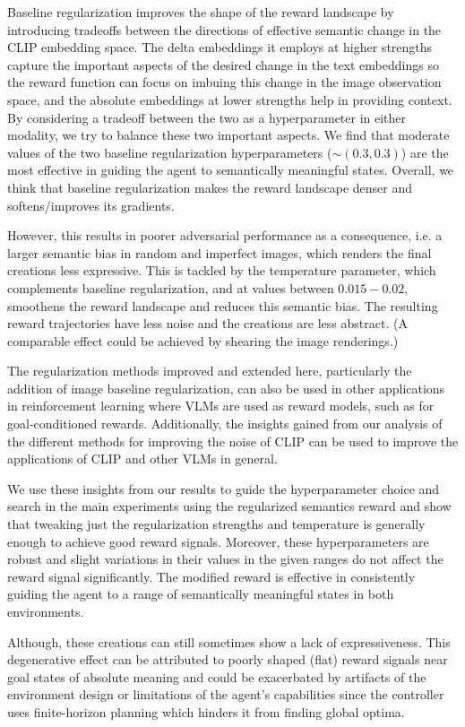 Baseline regularization improves the shape of the reward landscape by introducing tradeoffs between the directions of effective semantic change in the CLIP embedding space.
The delta embeddings it employs at higher strengths capture the important aspects of the desired change in the text embeddings so the reward function can focus on imbuing this change in the image observation space, and the absolute embeddings at lower strengths help in providing context.
By considering a tradeoff between the two as a hyperparameter in either modality, we try to balance these two important aspects.
We find that moderate values of the two baseline regularization hyperparameters (\(\sim (0.3, 0.3)\)) are the most effective in guiding the agent to semantically meaningful states.
Overall, we think that baseline regularization makes the reward landscape denser and softens/improves its gradients.

However, this results in poorer adversarial performance as a consequence, i.e. a larger semantic bias in random and imperfect images, which renders the final creations less expressive.
This is tackled by the temperature parameter, which complements baseline regularization, and at values between \(0.015 - 0.02\), smoothens the reward landscape and reduces this semantic bias.
The resulting reward trajectories have less noise and the creations are less abstract.
(A comparable effect could be achieved by shearing the image renderings.)

The regularization methods improved and extended here, particularly the addition of image baseline regularization, can also be used in other applications in reinforcement learning where VLMs are used as reward models, such as for goal-conditioned rewards.
Additionally, the insights gained from our analysis of the different methods for improving the noise of CLIP can be used to improve the applications of CLIP and other VLMs in general.

We use these insights from our results to guide the hyperparameter choice and search in the main experiments using the regularized semantics reward and show that tweaking just the regularization strengths and temperature is generally enough to achieve good reward signals.
Moreover, these hyperparameters are robust and slight variations in their values in the given ranges do not affect the reward signal significantly.
The modified reward is effective in consistently guiding the agent to a range of semantically meaningful states in both environments.

Although, these creations can still sometimes show a lack of expressiveness.
This degenerative effect can be attributed to poorly shaped (flat) reward signals near goal states of absolute meaning and could be exacerbated by artifacts of the environment design or limitations of the agent's capabilities since the controller uses finite-horizon planning which hinders it from finding global optima.

